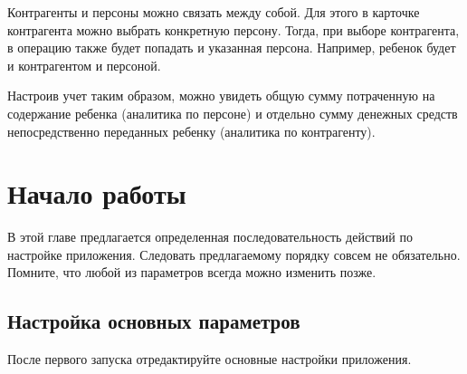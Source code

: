 \documentclass[a4paper,10pt,russian]{sphinxmanual}
\begin{document}
\sphinxAtStartPar
Контрагенты и персоны можно связать между собой. Для этого в карточке контрагента можно выбрать конкретную персону. Тогда,
при выборе контрагента, в операцию также будет попадать и указанная персона. Например, ребенок будет и контрагентом и персоной.

\sphinxAtStartPar
Настроив учет таким образом, можно увидеть общую сумму потраченную на содержание ребенка (аналитика по персоне)
и отдельно сумму денежных средств непосредственно переданных ребенку (аналитика по контрагенту).

\sphinxstepscope


\chapter{Начало работы}
\label{\detokenize{getting-started:id1}}\label{\detokenize{getting-started::doc}}
\sphinxAtStartPar
В этой главе предлагается определенная последовательность действий по настройке приложения. Следовать предлагаемому порядку совсем не обязательно. Помните, что любой из параметров всегда можно изменить позже.


\section{Настройка основных параметров}
\label{\detokenize{getting-started:id2}}
\sphinxAtStartPar
После первого запуска отредактируйте основные настройки приложения.

\noindent{}

\noindent{}

\noindent{}
\end{document}
